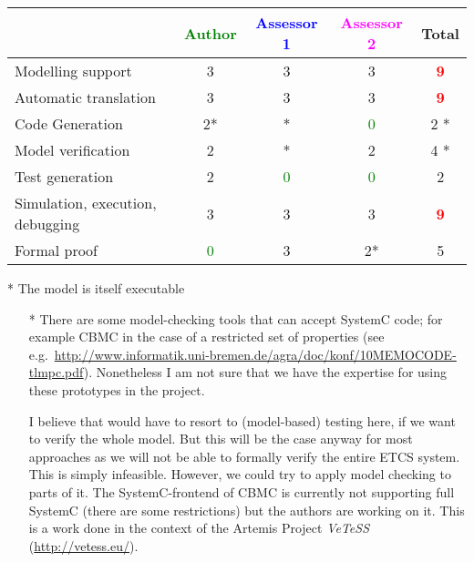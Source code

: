 \begin{tabular}{|l | c | c | c | c|}
\hline
& \textcolor{green}{Author} & \textcolor{blue}{Assessor 1} & \textcolor{magenta}{Assessor 2} & Total \\
\hline
Modelling support &3 &3 &3 & \textcolor{red}{\textbf{9}} \\
\hline
Automatic translation &3 &3 &3 & \textcolor{red}{\textbf{9}} \\
\hline
Code Generation &2* & * & \textcolor{green}{0}   & 2    * \\
\hline
Model verification &2 & * &2 & 4    * \\
\hline
Test generation &2 & \textcolor{green}{0}   & \textcolor{green}{0}   & 2     \\
\hline
Simulation, execution, debugging &3 &3 &3 & \textcolor{red}{\textbf{9}} \\
\hline
Formal proof & \textcolor{green}{0}   &3 &2* &  5\\
\hline
\end{tabular}

\begin{author_comment}
 * The model is itself executable
\end{author_comment}



\begin{assessor2}
  \begin{itemize}
  \item[*] There are some model-checking tools that can accept SystemC
    code; for example CBMC in the case of a restricted set of
    properties (see
    e.g.~\url{http://www.informatik.uni-bremen.de/agra/doc/konf/10MEMOCODE-tlmpc.pdf}). Nonetheless
    I am not sure that we have the expertise for using these
    prototypes in the project.
\begin{author_comment}
I believe that would have to resort to (model-based) testing here, if we want to verify the whole model. But this will be the case anyway for most approaches as we will not be able to formally verify the entire ETCS system. This is simply infeasible. However, we could try to apply model checking to parts of it. The SystemC-frontend of CBMC is currently not supporting full SystemC (there are some restrictions) but the authors are working on it. This is a work done in the context of the Artemis Project \emph{VeTeSS} (\url{http://vetess.eu/}).
\end{author_comment}
  \end{itemize}  
\end{assessor2}




